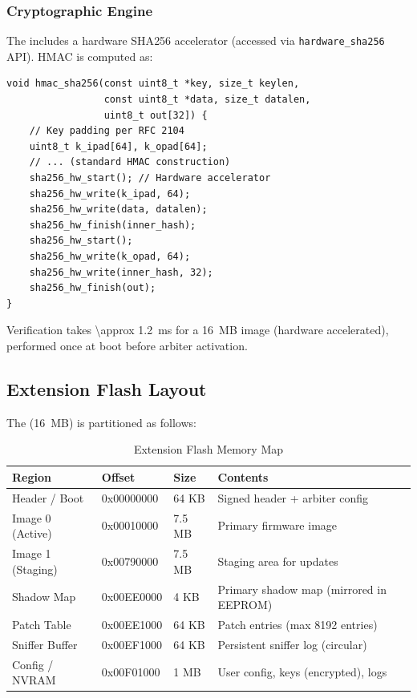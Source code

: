 \subsubsection{Cryptographic Engine}
The \rp includes a hardware \ac{SHA}256 accelerator (accessed via \texttt{hardware\_sha256} API). HMAC is computed as:
\begin{lstlisting}[style=vbfcStyle, caption={HMAC-SHA256 Computation}, label={lst:hmac}]
void hmac_sha256(const uint8_t *key, size_t keylen,
                 const uint8_t *data, size_t datalen,
                 uint8_t out[32]) {
    // Key padding per RFC 2104
    uint8_t k_ipad[64], k_opad[64];
    // ... (standard HMAC construction)
    sha256_hw_start(); // Hardware accelerator
    sha256_hw_write(k_ipad, 64);
    sha256_hw_write(data, datalen);
    sha256_hw_finish(inner_hash);
    sha256_hw_start();
    sha256_hw_write(k_opad, 64);
    sha256_hw_write(inner_hash, 32);
    sha256_hw_finish(out);
}
\end{lstlisting}

Verification takes \SI{\approx 1.2}{ms} for a \SI{16}{MB} image (hardware accelerated), performed once at boot before arbiter activation.

\subsection{Extension Flash Layout}
The \wq (\SI{16}{MB}) is partitioned as follows:

\begin{table}[h]
\centering
\caption{Extension Flash Memory Map}
\label{tab:flash_map}
\begin{tabular}{@{}llll@{}}
\toprule
\textbf{Region} & \textbf{Offset} & \textbf{Size} & \textbf{Contents} \\
\midrule
Header / Boot   & 0x00000000 & 64 KB   & Signed header + arbiter config \\
Image 0 (Active)& 0x00010000 & 7.5 MB  & Primary firmware image \\
Image 1 (Staging)& 0x00790000 & 7.5 MB  & Staging area for updates \\
Shadow Map      & 0x00EE0000 & 4 KB    & Primary shadow map (mirrored in EEPROM) \\
Patch Table     & 0x00EE1000 & 64 KB   & Patch entries (max 8192 entries) \\
Sniffer Buffer  & 0x00EF1000 & 64 KB   & Persistent sniffer log (circular) \\
Config / NVRAM  & 0x00F01000 & 1 MB    & User config, keys (encrypted), logs \\
\bottomrule
\end{tabular}
\end{table}


